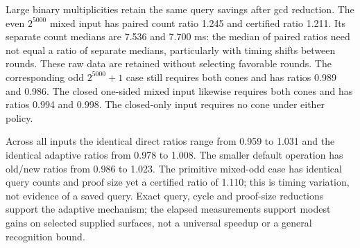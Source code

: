 Large binary multiplicities retain the same query savings after gcd
reduction. The even $2^{5000}$ mixed input has paired count ratio 1.245
and certified ratio 1.211. Its separate count medians are 7.536 and
7.700 ms: the median of paired ratios need not equal a ratio of separate
medians, particularly with timing shifts between rounds. These raw data
are retained without selecting favorable rounds. The corresponding odd
$2^{5000}+1$ case still requires both cones and has ratios 0.989 and
0.986. The closed one-sided mixed input likewise requires both cones and
has ratios 0.994 and 0.998. The closed-only input requires no cone under
either policy.

Across all inputs the identical direct ratios range from 0.959 to 1.031
and the identical adaptive ratios from 0.978 to 1.008. The smaller default
operation has old/new ratios from 0.986 to 1.023. The primitive mixed-odd
case has identical query counts and proof size yet a certified ratio of
1.110; this is timing variation, not evidence of a saved query. Exact
query, cycle and proof-size reductions support the adaptive mechanism;
the elapsed measurements support modest gains on selected supplied
surfaces, not a universal speedup or a general recognition bound.
